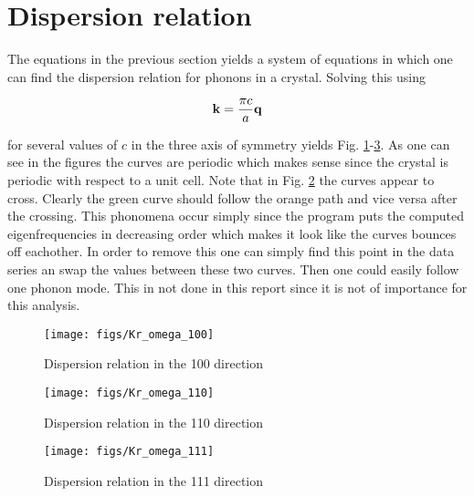\section{Dispersion relation}

The equations in the previous section yields a system of equations in which one can find the dispersion relation for phonons in a crystal. Solving this using

\begin{equation*}
  \mathbf{k} = \frac{\pi c}{a}\mathbf{q}
\end{equation*}

for several values of $c$ in the three axis of symmetry yields Fig. \ref{fig:100}-\ref{fig:111}. As one can see in the figures the curves are periodic which makes sense since the crystal is periodic with respect to a unit cell. Note that in Fig. \ref{fig:110} the curves appear to cross. Clearly the green curve should follow the orange path and vice versa after the crossing. This phonomena occur simply since the program puts the computed eigenfrequencies in decreasing order which makes it look like the curves bounces off eachother. In order to remove this one can simply find this point in the data series an swap the values between these two curves. Then one could easily follow one phonon mode. This in not done in this report since it is not of importance for this analysis.


\begin{figure}[H]
  \centering
  \texttt{[image: figs/Kr\_omega\_100]}
  \caption{Dispersion relation in the 100 direction}
  \label{fig:100}
\end{figure}

\begin{figure}[H]
  \centering
  \texttt{[image: figs/Kr\_omega\_110]}
  \caption{Dispersion relation in the 110 direction}
  \label{fig:110}
\end{figure}

\begin{figure}[H]
  \centering
  \texttt{[image: figs/Kr\_omega\_111]}
  \caption{Dispersion relation in the 111 direction}
  \label{fig:111}
\end{figure}
